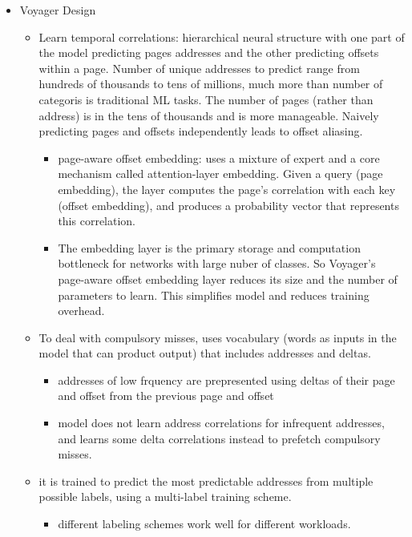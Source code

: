 \documentclass [12pt]{article}
\begin{document}
\begin{itemize}
            \item Voyager Design 
                \begin{itemize}
                    \item Learn temporal correlations: hierarchical neural structure with one part of the model predicting pages addresses and the other predicting offsets within a page. Number of unique addresses to predict range from hundreds of thousands to tens of millions, much more than number of categoris is traditional ML tasks. The number of pages (rather than address) is in the tens of thousands and is more manageable. Naively predicting pages and offsets independently leads to offset aliasing. 
                        \begin{itemize}
                            \item page-aware offset embedding: uses a mixture of expert and a core mechanism called attention-layer embedding. Given a query (page embedding), the layer computes the page's correlation with each key (offset embedding), and produces a probability vector that represents this correlation.
                            \item The embedding layer is the primary storage and computation bottleneck for networks with large nuber of classes. So Voyager's page-aware offset embedding layer reduces its size and the number of parameters to learn. This simplifies model and reduces training overhead. 
                        \end{itemize}
                    \item To deal with compulsory misses, uses vocabulary (words as inputs in the model that can product output) that includes addresses and deltas. 
                        \begin{itemize}
                            \item addresses of low frquency are prepresented using deltas of their page and offset from the previous page and offset 
                            \item model does not learn address correlations for infrequent addresses, and learns some delta correlations instead to prefetch compulsory misses.
                        \end{itemize}
                    \item it is trained to predict the most predictable addresses from multiple possible labels, using a multi-label training scheme. 
                        \begin{itemize}
                            \item different labeling schemes work well for different workloads.

\end{itemize}
\end{itemize}
\end{itemize}
\end{document}
